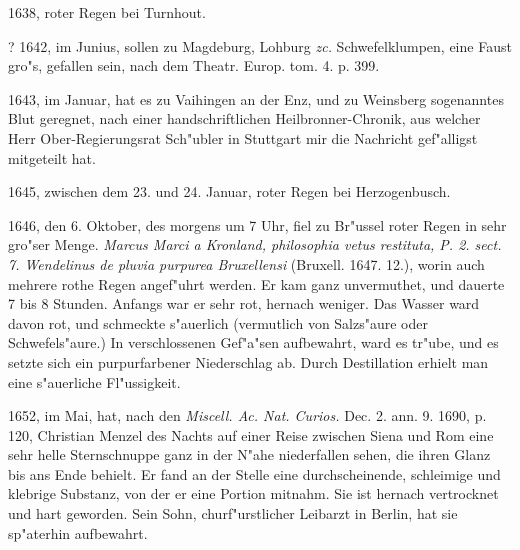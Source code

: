 \documentclass[a4paper, 11pt, oneside, polutonikogreek, german]{article}
\begin{document}
1638, roter Regen bei Turnhout.

? 1642, im Junius, sollen zu Magdeburg, Lohburg \emph{zc.} Schwefelklumpen, eine Faust gro"s, gefallen sein, nach dem Theatr. Europ. tom. 4. p. 399.

1643, im Januar, hat es zu Vaihingen an der Enz, und zu Weinsberg sogenanntes Blut geregnet, nach einer handschriftlichen Heilbronner-Chronik, aus welcher Herr Ober-Regierungsrat Sch"ubler in Stuttgart mir die Nachricht gef"alligst mitgeteilt hat.

1645, zwischen dem 23. und 24. Januar, roter Regen bei Herzogenbusch.

1646, den 6. Oktober, des morgens um 7 Uhr, fiel zu Br"ussel roter Regen in sehr gro"ser Menge. \emph{Marcus Marci a Kronland, philosophia vetus restituta, P. 2. sect. 7. Wendelinus de pluvia purpurea Bruxellensi} (Bruxell. 1647. 12.), worin auch mehrere rothe Regen angef"uhrt werden. Er kam ganz unvermuthet, und dauerte 7 bis 8 Stunden. Anfangs war er sehr rot, hernach weniger. Das Wasser ward davon rot, und schmeckte s"auerlich (vermutlich von Salzs"aure oder Schwefels"aure.) In verschlossenen Gef"a"sen aufbewahrt, ward es tr"ube, und es setzte sich ein purpurfarbener Niederschlag ab. Durch Destillation erhielt man eine s"auerliche Fl"ussigkeit.

1652, im Mai, hat, nach den \emph{Miscell. Ac. Nat. Curios.} Dec. 2. ann. 9. 1690, p. 120, Christian Menzel des Nachts auf einer Reise zwischen Siena und Rom eine sehr helle Sternschnuppe ganz in der N"ahe niederfallen sehen, die ihren Glanz bis ans Ende behielt. Er fand an der Stelle eine durchscheinende, schleimige und klebrige Substanz, von der er eine Portion mitnahm. Sie ist hernach vertrocknet und hart geworden. Sein Sohn, churf"urstlicher Leibarzt in Berlin, hat sie sp"aterhin aufbewahrt.
\end{document}
